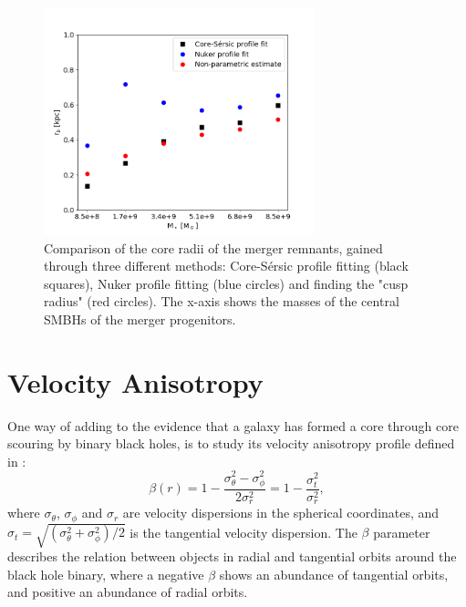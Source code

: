 \documentclass[english, oneside]{HYgradu}
\begin{document}
\begin{figure}[h]
	\centering
	\includegraphics[width=0.7\textwidth]{rb_mass_relation.png}
	\caption{Comparison of the core radii of the merger remnants, gained through three different methods: Core-Sérsic profile fitting (black squares), Nuker profile fitting (blue circles) and  finding the "cusp radius" (red circles). The x-axis shows the masses of the central SMBHs of the merger progenitors.}
	\label{figure:radii_comparison}
\end{figure}

\section{Velocity Anisotropy}


One way of adding to the evidence that a galaxy has formed a core through core scouring by binary black holes, is to study its velocity anisotropy profile defined in \cite{BinneyTremaine}:
\begin{equation}
\beta(r) = 1 - \frac{\sigma_\theta^2 - \sigma_\phi^2}{2\sigma_r^2} = 1 - \frac{\sigma_t^2}{\sigma_r^2}, \label{eq:beta}
\end{equation}
where $\sigma_\theta$, $\sigma_\phi$ and $\sigma_r$ are velocity dispersions in the spherical coordinates, and $\sigma_t = \sqrt{(\sigma_\theta^2 + \sigma_\phi^2) / 2}$ is the tangential velocity dispersion. The $\beta$ parameter describes the relation between objects in radial and tangential orbits around the black hole binary, where a negative $\beta$ shows an abundance of tangential orbits, and positive an abundance of radial orbits. 
\end{document}
